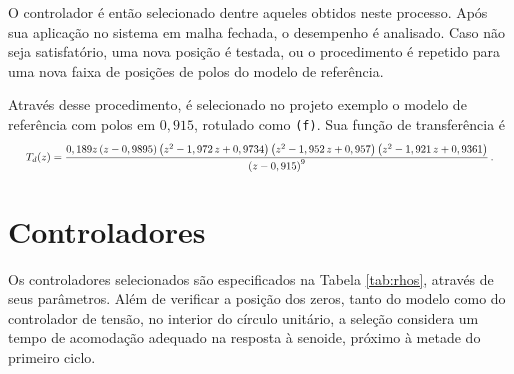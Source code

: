 \documentclass[repeatfields,oneside]{tcc}
\newcommand{\mycdot}{ \, }
\begin{document}
O controlador é então selecionado dentre aqueles obtidos neste processo.
Após sua aplicação no sistema em malha fechada, o desempenho é analisado.
Caso não seja satisfatório, uma nova posição é testada, ou o procedimento é repetido para uma nova faixa de posições de polos do modelo de referência.

Através desse procedimento, é selecionado no projeto exemplo o modelo de referência com polos em $0,915$, rotulado como \texttt{(f)}.
Sua função de transferência é
\begin{equation}
    \resizebox{.97\textwidth}{!}{$%
    T_d(z) = \dfrac{  0,189  z \left(z-0,9895\right) \left(z^2 - 1,972 \mycdot z + 0,9734\right) \left(z^2 - 1,952 \mycdot z + 0,957\right) \left(z^2 - 1,921 \mycdot z + 0,9361\right) }
                   { \left( z - 0,915 \right)^9 }
    \,.
    $}%
\end{equation}

\section{Controladores}

Os controladores selecionados são especificados na Tabela \ref{tab:rhos}, através de seus parâmetros.
Além de verificar a posição dos zeros, tanto do modelo como do controlador de tensão, no interior do círculo unitário, a seleção considera um tempo de acomodação adequado na resposta à senoide, próximo à metade do primeiro ciclo.
\end{document}
